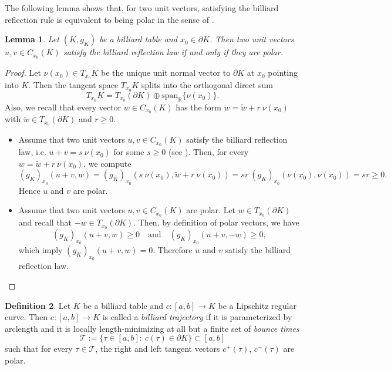 \documentclass[11pt]{article}
\theoremstyle{definition}
\newtheorem{definition}{Definition}[section]
\theoremstyle{remark}
\theoremstyle{plain}
\newtheorem{lemma}[definition]{Lemma}
\newcommand{\R}{\mathbb{R}}
\begin{document}
The following lemma shows that, for two unit vectors, satisfying the billiard reflection rule is equivalent to being polar in the sense of .

\begin{lemma}

Let $(K,g_K)$ be a billiard table and $x_0\in \partial K$. Then two unit vectors $u,v\in C_{x_0}(K)$ satisfy the billiard reflection law if and only if they are polar.

\end{lemma}

\begin{proof}
  
Let $\nu(x_0)\in T_{x_0}K$ be the unique unit normal vector to $\partial K$ at $x_0$ pointing into $K$. Then the tangent space $T_{x_0} K$ splits into the orthogonal direct sum 
$$T_{x_0} K = T_{x_0}(\partial K)\oplus \mbox{span}_{\R}\{\nu(x_0)\}.$$ 
Also, we recall that every vector $w\in C_{x_0}(K)$ has the form $w = \tilde w + r\ \nu(x_0)$ with $\tilde{w}\in T_{x_0}(\partial K)$ and $r\ge0$.

\begin{itemize}

\item[$(\Rightarrow)$] Assume that two unit vectors $u,v\in C_{x_0}(K)$ satisfy the billiard reflection law, i.e. $u + v = s \ \nu(x_0)$ for some $s\ge 0$ (see ). Then, for every $w = \tilde{w} + r\ \nu(x_0)$, we compute
    $$(g_K)_{x_0}(u+v,w) = (g_K)_{x_0}(s\ \nu(x_0),\tilde{w} + r\ \nu(x_0)) = sr\ (g_K)_{x_0}(\nu(x_0),\nu(x_0)) = sr\ge0.$$
    Hence $u$ and $v$ are polar.
\end{itemize}

\begin{itemize}

\item[$(\Leftarrow)$] Assume that two unit vectors $u,v\in C_{x_0}(K)$ are polar. Let $w\in T_{x_0}(\partial K)$ and recall that $-w\in T_{x_0}(\partial K)$. Then, by definition of polar vectors, we have
    $$(g_K)_{x_0}(u+v, w)\ge 0 \quad \text{and}\quad (g_K)_{x_0}(u+v,-w) \ge 0,$$
    which imply $(g_K)_{x_0}(u+v,w) = 0$. Therefore $u$ and $v$ satisfy the billiard reflection law.
\end{itemize}


\end{proof}


\begin{definition}

Let $K$ be a billiard table and $c:[a,b]\rightarrow K$ be a Lipschitz regular curve. Then $c: [a,b]\rightarrow K$ is called a \textit{billiard trajectory} if it is parameterized by arclength and it is locally length-minimizing at all but a finite set of \emph{bounce times}
$$\mathcal{T}:= \{\tau\in [a,b]: \ c(\tau)\in \partial K\}\subset [a,b]$$ 
such that for every $\tau\in \mathcal{T}$, the right and left tangent vectors $c^+(\tau)$, $c^-(\tau)$ are polar.

\end{definition}
\end{document}
